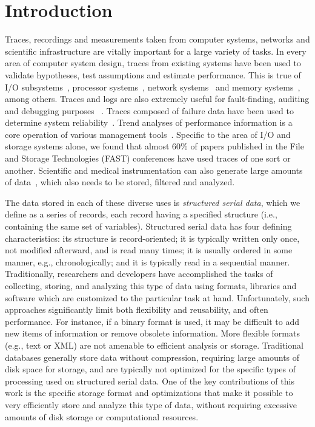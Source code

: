 \section{Introduction}\label{sec:introduction}

Traces, recordings and measurements taken from computer systems,
networks and scientific infrastructure are vitally important
for a large variety of 
tasks. In every area of computer system design, traces from existing
systems have been used to validate hypotheses, test assumptions and
estimate performance. This is true of I/O subsystems~\cite{IORef,Ji03,Uysal03},
processor systems~\cite{ProcRef}, network systems~\cite{NetRef} and
memory systems~\cite{MemRef}, among others. Traces and logs are also
extremely useful for fault-finding, auditing and debugging purposes
~\cite{DebugRef}. Traces composed of failure data have been used to
determine system reliability~\cite{ReliabilityRef, Schroeder07,
Pinheiro07}. Trend analyses of performance information is a core
operation of various management tools~\cite{MgmtRef}. Specific to the
area of I/O and storage systems alone, we found that almost 60\% of
papers published in the File and Storage Technologies (FAST) conferences
have used traces of one sort or another. 
Scientific and
medical instrumentation can also generate large amounts of
data~\cite{SciRef}, which also needs to be stored, filtered and analyzed.

The data stored in each of these diverse
uses is {\it structured serial data}, which we
define as a series of records, each record having a specified
structure (i.e., containing the same set of variables). Structured serial data
has four defining characteristics: its structure is record-oriented;
it is typically written only once,
not modified afterward, and is read many times; it is usually
ordered in some manner, e.g., chronologically; and it is
typically read in a sequential manner.  Traditionally, researchers and
developers have accomplished the tasks of collecting, storing, and
analyzing this type of data using formats, libraries and software
which are customized to the particular task at hand.  Unfortunately,
such approaches significantly limit both flexibility and reusability, 
and often performance.  For instance, if a
binary format is used, it may be difficult to add new items of
information or remove obsolete information.
More flexible formats
(e.g., text or XML)
are not amenable to efficient analysis or storage. 
Traditional databases
generally store data without compression, requiring large amounts of
disk space for storage, and are typically not optimized for the
specific types of processing used on structured serial data. 
One of the key contributions
of this work is the specific storage format and optimizations that make
it possible to very efficiently store and analyze this type of data, 
without requiring
excessive amounts of disk storage or computational resources.

